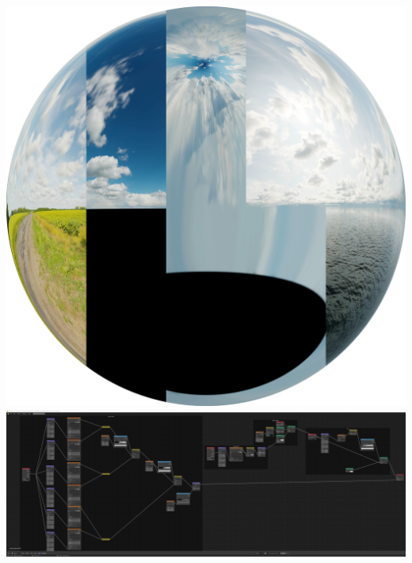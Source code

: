\includegraphics[width=\textwidth]{gfx/prod/env/env.jpg}
\includegraphics[width=\textwidth]{gfx/prod/env/ocean_shader.jpg}

